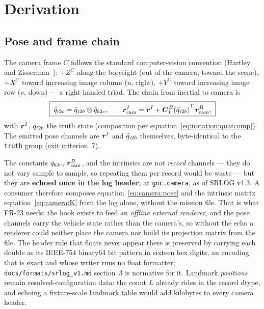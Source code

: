 \section{Derivation}
\label{sec:camera:derivation}

\subsection{Pose and frame chain}
\label{sec:camera:pose}

The camera frame $C$ follows the standard computer-vision convention
(Hartley and Zisserman~\cite{hartley2004}): $+Z^{C}$ along the boresight
(out of the camera, toward the scene), $+X^{C}$ toward increasing image
column ($u$, right), $+Y^{C}$ toward increasing image row ($v$, down) ---
a right-handed triad. The chain from inertial to camera is
\begin{equation}
  \boxed{\;
  \bar{q}_{i2c} = \bar{q}_{i2b} \otimes \bar{q}_{b2c},
  \qquad
  \bm{r}_{\mathrm{cam}}^{I} = \bm{r}^{I}
    + {\bm{C}_{I}^{B}(\bar{q}_{i2b})}^{\mathsf T}\, \bm{r}_{\mathrm{cam}}^{B},
  \;}
  \label{eq:camera:pose}
\end{equation}
with $\bm{r}^{I}$, $\bar{q}_{i2b}$ the truth state (composition per
equation~\eqref{eq:notation:quatcomp}). The emitted pose channels are
$\bm{r}^{I}$ and $\bar{q}_{i2b}$ themselves, byte-identical to the
\texttt{truth} group (exit criterion~7).

The constants $\bar{q}_{b2c}$, $\bm{r}_{\mathrm{cam}}^{B}$, and the
intrinsics are not \emph{record} channels --- they do not vary sample to
sample, so repeating them per record would be waste --- but they are
\textbf{echoed once in the log header}, at \texttt{gnc.camera}, as of
SRLOG v1.3. A consumer therefore composes
equation~\eqref{eq:camera:pose} and the intrinsic matrix
equation~\eqref{eq:camera:K} from the log alone, without the mission
file. That is what FR-23 needs: the hook exists to feed an \emph{offline
external renderer}, and the pose channels carry the vehicle state rather
than the camera's, so without the echo a renderer could neither place the
camera nor build its projection matrix from the file. The header rule
that floats never appear there is preserved by carrying each double as
its IEEE-754 binary64 bit pattern in sixteen hex digits, an encoding that
is exact and whose writer runs no float formatter;
\texttt{docs/formats/srlog\_v1.md} section~3 is normative for it. Landmark
\emph{positions} remain resolved-configuration data: the count $L$ already
rides in the record dtype, and echoing a fixture-scale landmark table
would add kilobytes to every camera header.


